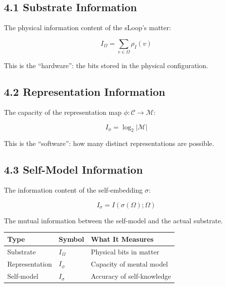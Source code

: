 \documentclass[
  11pt,
  letterpaper,
  twoside,
  openright]{book}
\begin{document}
\subsection{4.1 Substrate Information}\label{substrate-information}

The physical information content of the sLoop's matter:

\[I_\Omega = \sum_{v \in \Omega} \rho_I(v)\]

This is the ``hardware'': the bits stored in the physical configuration.

\subsection{4.2 Representation
Information}\label{representation-information}

The capacity of the representation map
\(\phi: \mathcal{C} \to \mathcal{M}\):

\[I_\phi = \log_2 |\mathcal{M}|\]

This is the ``software'': how many distinct representations are
possible.

\subsection{4.3 Self-Model Information}\label{self-model-information}

The information content of the self-embedding \(\sigma\):

\[I_\sigma = I(\sigma(\Omega); \Omega)\]

The mutual information between the self-model and the actual substrate.

\begin{tcolorbox}[enhanced jigsaw, coltitle=black, colbacktitle=quarto-callout-note-color!10!white, toprule=.15mm, colframe=quarto-callout-note-color-frame, arc=.35mm, opacityback=0, bottomtitle=1mm, toptitle=1mm, breakable, colback=white, titlerule=0mm, opacitybacktitle=0.6, title=\textcolor{quarto-callout-note-color}{\faInfo}\hspace{0.5em}{The Three Information Types}, rightrule=.15mm, bottomrule=.15mm, leftrule=.75mm, left=2mm]

\begin{longtable}[]{@{}lll@{}}
\toprule\noalign{}
Type & Symbol & What It Measures \\
\midrule\noalign{}
\endhead
\bottomrule\noalign{}
\endlastfoot
Substrate & \(I_\Omega\) & Physical bits in matter \\
Representation & \(I_\phi\) & Capacity of mental model \\
Self-model & \(I_\sigma\) & Accuracy of self-knowledge \\
\end{longtable}

\end{tcolorbox}
\end{document}
